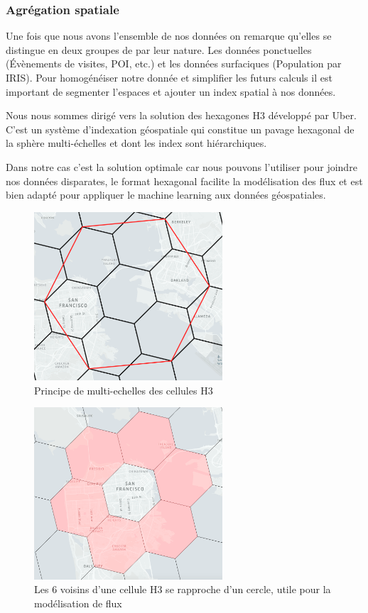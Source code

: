 \subsubsection{Agrégation spatiale}

Une fois que nous avons l'ensemble de nos données on remarque qu'elles se distingue en deux groupes de par leur nature. Les données ponctuelles (\'Evènements de visites, POI, etc.) et les données surfaciques (Population par IRIS). Pour homogénéiser notre donnée et simplifier les futurs calculs il est important de segmenter l'espaces et ajouter un index spatial à nos données.

Nous nous sommes dirigé vers la solution des hexagones H3 \cite{Uber_H3} développé par Uber. C'est un système d'indexation géospatiale qui constitue un pavage hexagonal de la sphère multi-échelles et dont les index sont hiérarchiques.

Dans notre cas c'est la solution optimale car nous pouvons l'utiliser pour joindre nos données disparates, le format hexagonal facilite la modélisation des flux et est bien adapté pour appliquer le machine learning aux données géospatiales.


\begin{figure}[H]
    \centering
    \includegraphics[width=7cm]{images/graphs/h3-multiscale.png}
    \caption{Principe de multi-echelles des cellules H3}
    \label{fig:celluleh3}
\end{figure}

\begin{figure}[H]
    \centering
    \includegraphics[width=7cm]{images/graphs/h3-ring.png}
    \captionsetup{justification=centering}
    \caption{Les 6 voisins d'une cellule H3 se rapproche d'un cercle, utile pour la modélisation de flux}
    \label{fig:celluleh3ring}
\end{figure}

